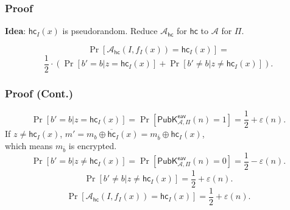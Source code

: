 \begin{frame}\frametitle{Proof}
\textbf{Idea}: $\mathsf{hc}_I(x)$ is pseudorandom. Reduce $\mathcal{A}_{\mathsf{hc}}$ for $\mathsf{hc}$ to $\mathcal{A}$ for $\Pi$.
\begin{figure}
\begin{center}

\end{center}
\end{figure}
\[\Pr[\mathcal{A}_{\mathsf{hc}}(I,f_I(x))=\mathsf{hc}_I(x)] = \]
\[\frac{1}{2}\cdot (\Pr[b'=b|z=\mathsf{hc}_I(x)]+\Pr[b'\neq b|z\neq \mathsf{hc}_I(x)]).\]
\end{frame}
\begin{frame}\frametitle{Proof (Cont.)}
\[\Pr[b'=b|z=\mathsf{hc}_I(x)] = \Pr[\mathsf{PubK}^{\mathsf{eav}}_{\mathcal{A},\Pi}(n)=1]=\frac{1}{2} + \varepsilon(n).\]
If $z \neq \mathsf{hc}_I(x)$, $m' = m_b\oplus \overline{\mathsf{hc}}_I(x) = m_{\overline{b}}\oplus \mathsf{hc}_I(x)$,\\ which means $m_{\overline{b}}$ is encrypted.
\[\Pr[b'=b|z\neq \mathsf{hc}_I(x)] = \Pr[\mathsf{PubK}^{\mathsf{eav}}_{\mathcal{A},\Pi}(n)=0]=\frac{1}{2} -\varepsilon(n).\]
\[\Pr[b'\neq b|z\neq \mathsf{hc}_I(x)] =\frac{1}{2} + \varepsilon(n).\]
\[\Pr[\mathcal{A}_{\mathsf{hc}}(I,f_I(x))=\mathsf{hc}_I(x)] = \frac{1}{2} + \varepsilon(n).\]
\end{frame}
%
%
